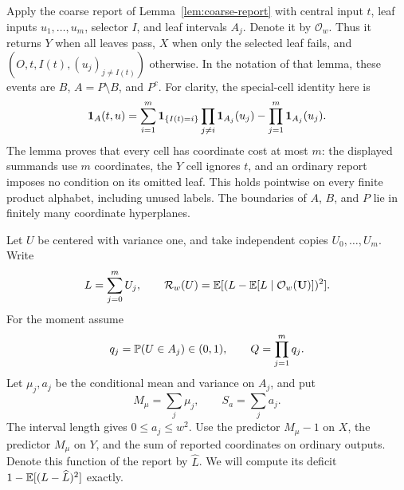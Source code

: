 Apply the coarse report of Lemma~\ref{lem:coarse-report} with central
input $t$, leaf inputs $u_1,\ldots,u_m$, selector $I$, and leaf
intervals $A_j$.  Denote it by $\mathcal O_w$.  Thus it returns $Y$
when all leaves pass, $X$ when only the selected leaf fails, and
$(O,t,I(t),(u_j)_{j\ne I(t)})$ otherwise.  In the notation of that
lemma, these events are $B$, $A=P\setminus B$, and $P^c$.
For clarity, the special-cell identity here is
\begin{equation}\label{app:small-width-cell}
 \mathbf 1_A(t,u)=
 \sum_{i=1}^m\mathbf 1_{\{I(t)=i\}}\prod_{j\ne i}\mathbf 1_{A_j}(u_j)
       -\prod_{j=1}^m\mathbf 1_{A_j}(u_j).
\end{equation}
The lemma proves that every cell has coordinate cost at most $m$:
the displayed summands use $m$ coordinates, the $Y$ cell ignores $t$,
and an ordinary report imposes no condition on its omitted leaf.
This holds pointwise on every finite product alphabet, including
unused labels.  The boundaries of $A$, $B$, and $P$ lie in finitely
many coordinate hyperplanes.

Let $U$ be centered with variance one, and take independent copies
$U_0,\ldots,U_m$.  Write
\[
 L=\sum_{j=0}^mU_j,\qquad
 \mathcal R_w(U)=\mathbb E[(L-\mathbb E[L\mid\mathcal O_w(\mathbf U)])^2].
\]
For the moment assume
\[
 q_j=\mathbb P(U\in A_j)\in(0,1),\qquad Q=\prod_{j=1}^m q_j.
\]
Let $\mu_j,a_j$ be the conditional mean and variance on $A_j$,
and put
\[
 M_\mu=\sum_j\mu_j,\qquad S_a=\sum_j a_j.
\]
The interval length gives $0\le a_j\le w^2$.
Use the predictor $M_\mu-1$ on $X$, the predictor $M_\mu$ on $Y$,
and the sum of reported coordinates on ordinary outputs. Denote this
function of the report by $\widehat L$. We will compute its deficit
$1-\mathbb E[(L-\widehat L)^2]$ exactly.

